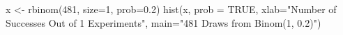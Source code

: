 \begin{Schunk}
\begin{Sinput}
  x <- rbinom(481, size=1, prob=0.2)
  hist(x, prob = TRUE, xlab="Number of Successes Out of 1 Experiments", main="481 Draws from Binom(1, 0.2)")
\end{Sinput}
\end{Schunk}
